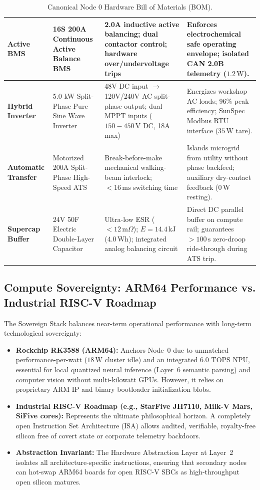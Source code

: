 \begin{table}[htbp]
\begin{tabular}{|p{}|p{}|p{}|p{}|}
\hline
\textbf{Active BMS} & 16S 200A Continuous Active Balance BMS & 2.0A inductive active balancing; dual contactor control; hardware over/undervoltage trips & Enforces electrochemical safe operating envelope; isolated CAN 2.0B telemetry ($1.2\,\mathrm{W}$). \\
\hline
\textbf{Hybrid Inverter} & 5.0 kW Split-Phase Pure Sine Wave Inverter & 48V DC input $\to$ 120V/240V AC split-phase output; dual MPPT inputs ($150-450\,\mathrm{V}$ DC, 18A max) & Energizes workshop AC loads; 96\% peak efficiency; SunSpec Modbus RTU interface ($35\,\mathrm{W}$ tare). \\
\hline
\textbf{Automatic Transfer} & Motorized 200A Split-Phase High-Speed ATS & Break-before-make mechanical walking-beam interlock; $<16\,\mathrm{ms}$ switching time & Islands microgrid from utility without phase backfeed; auxiliary dry-contact feedback ($0\,\mathrm{W}$ resting). \\
\hline
\textbf{Supercap Buffer} & 24V 50F Electric Double-Layer Capacitor & Ultra-low ESR ($<12\,\mathrm{m}\Omega$); $E = 14.4\,\mathrm{kJ}$ ($4.0\,\mathrm{Wh}$); integrated analog balancing circuit & Direct DC parallel buffer on compute rail; guarantees $>100\,\mathrm{s}$ zero-droop ride-through during ATS trip. \\
\hline
\end{tabular}
\caption{Canonical Node 0 Hardware Bill of Materials (BOM).}
\label{tab:node0-bom}
\end{table}

\subsection{Compute Sovereignty: ARM64 Performance vs. Industrial RISC-V Roadmap}

The Sovereign Stack balances near-term operational performance with long-term technological sovereignty:
\begin{itemize}
    \item \textbf{Rockchip RK3588 (ARM64):} Anchors Node~0 due to unmatched performance-per-watt ($18\,\mathrm{W}$ cluster idle) and an integrated 6.0 TOPS NPU, essential for local quantized neural inference (Layer~6 semantic parsing) and computer vision without multi-kilowatt GPUs. However, it relies on proprietary ARM IP and binary bootloader initialization blobs.
    \item \textbf{Industrial RISC-V Roadmap (e.g., StarFive JH7110, Milk-V Mars, SiFive cores):} Represents the ultimate philosophical horizon. A completely open Instruction Set Architecture (ISA) allows audited, verifiable, royalty-free silicon free of covert state or corporate telemetry backdoors.
    \item \textbf{Abstraction Invariant:} The Hardware Abstraction Layer at Layer~2 isolates all architecture-specific instructions, ensuring that secondary nodes can hot-swap ARM64 boards for open RISC-V SBCs as high-throughput open silicon matures.
\end{itemize}

